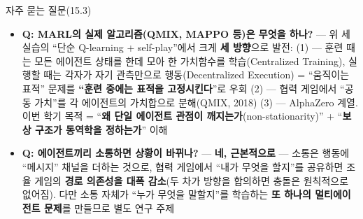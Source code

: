 \documentclass[aspectratio=169,11pt]{beamer}
\begin{document}
\begin{frame}{자주 묻는 질문(15.3)}
  \small
  \begin{itemize}
    \item \textbf{Q: MARL의 실제 알고리즘(QMIX, MAPPO
      등)은 무엇을 하나?} --- 위 세 실습의 ``단순 Q-learning
      + self-play''에서 크게 \textbf{세 방향}으로 발전:
      (1)  --- 훈련 때는 모든
      에이전트 상태를 한데 모아 한 가치함수를
      학습(Centralized Training), 실행할 때는 각자가 자기
      관측만으로 행동(Decentralized Execution) =
      ``움직이는 표적'' 문제를 \textbf{``훈련 중에는 표적을
      고정시킨다}''로 우회 (2)  ---
      협력 게임에서 ``공동 가치''를 각 에이전트의 가치합으로
      분해(QMIX, 2018) (3)  ---
      AlphaZero 계열. 이번 학기 목적 = ``\textbf{왜 단일
      에이전트 관점이 깨지는가}(non-stationarity)'' +
      ``\textbf{보상 구조가 동역학을 정하는가}'' 이해
    \item \textbf{Q: 에이전트끼리 소통하면 상황이 바뀌나?}
      --- \textbf{네, 근본적으로} --- 소통은 행동에 ``메시지''
      채널을 더하는 것으로, 협력 게임에서 ``내가 무엇을
      할지''를 공유하면 조율 게임의 \textbf{경로 의존성을
      대폭 감소}(두 차가 방향을 합의하면 충돌은 원칙적으로
      없어짐). 다만 소통 자체가 ``누가 무엇을 말할지''를
      학습하는 \textbf{또 하나의 멀티에이전트 문제}를
      만들므로 별도 연구 주제
  \end{itemize}
\end{frame}
\end{document}
